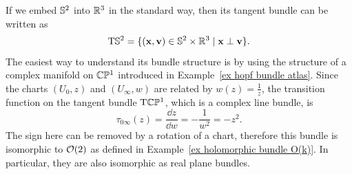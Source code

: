 \begin{example}\label{ex tangent bundle of S2}
    If we embed $\mathbb{S}^2$ into $\mathbb{R}^3$ in the standard way, then its tangent bundle can be written as
    \[\mathrm{T}\mathbb{S}^2=\{(\mathbf{x},\mathbf{v})\in \mathbb{S}^2\times\mathbb{R}^3\mid \mathbf{x}\perp\mathbf{v}\}.\label{eq TS2 in R3}\]
    The easiest way to understand its bundle structure is by using the structure of a complex manifold on $\mathbb{C}\mathbb{P}^1$ introduced in Example~\ref{ex hopf bundle atlas}. Since the charts $(U_0,z)$ and $(U_\infty,w)$ are related by $w(z)=\frac{1}{z}$, the transition function on the tangent bundle $\mathrm{T}\mathbb{C}\mathbb{P}^1$, which is a complex line bundle, is 
    \[\tau_{0\infty}(z)=\frac{\dd z}{\dd w}=-\frac{1}{w^2}=-z^2.\]
    The sign here can be removed by a rotation of a chart, therefore this bundle is isomorphic to $\mathcal{O}(2)$ as defined in Example~\ref{ex holomorphic bundle O(k)}. In particular, they are also isomorphic as real plane bundles.


\end{example}
